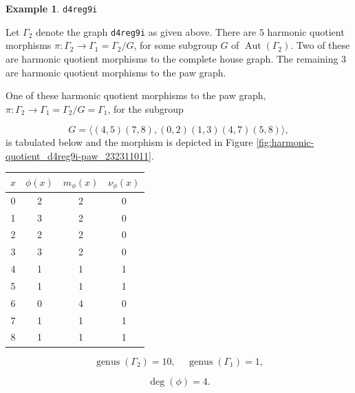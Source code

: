 \documentclass[12pt,letterpaper]{article}
\theoremstyle{definition}
\newtheorem{example}[theorem]{Example}
\DeclareMathOperator{\Aut}{Aut}
\DeclareMathOperator{\genus}{genus}
\begin{document}
\begin{example}%
\label{example:d4reg9i}
 {\tt d4reg9i}\newline
{\rm  
Let $\Gamma_2$ denote the graph {\tt d4reg9i} as given above.
There are $5$ harmonic quotient morphisms
$\pi: \Gamma_2\to \Gamma_1=\Gamma_2/G$,
for some subgroup $G$ of $\Aut(\Gamma_2)$.
Two of these are harmonic quotient morphisms to the complete house graph.
The remaining $3$ are harmonic quotient morphisms to the paw graph.

One of these harmonic quotient morphisms to the paw graph,
$\pi: \Gamma_2\to \Gamma_1=\Gamma_2/G=\Gamma_1$,
for the subgroup

\[
G = \langle (4,5)(7,8), (0,2)(1,3)(4,7)(5,8) \rangle,
\]
is tabulated below and the morphism is depicted
in Figure \ref{fig:harmonic-quotient_d4reg9i-paw_232311011}.

\begin{center}
\begin{tabular}{c|c|c|c}  
  $x$ & $\phi(x)$ & $m_\phi(x)$ & $\nu_\phi(x)$ \\ \hline
  0   &    2   &        2         &  0   \\ 
  1   &    3   &        2         &  0  \\ 
  2   &    2   &        2         &  0  \\ 
  3   &    3   &        2         &  0  \\ 
  4   &    1   &        1         &  1   \\
  5   &    1   &        1         &  1   \\
  6   &    0   &        4         &  0   \\
  7   &    1   &        1         &  1   \\
  8   &    1   &        1         &  1   \\ 
\end{tabular}
\end{center}

\[
  \genus(\Gamma_2) =10,\ \ \ \ \
  \genus(\Gamma_1) =1,
\]

\[
\deg(\phi) =4.
\]

}
\end{example}
\end{document}
